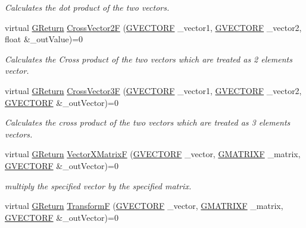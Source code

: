 \begin{DoxyCompactItemize}
\begin{DoxyCompactList}\small\item\em Calculates the dot product of the two vectors. \end{DoxyCompactList}\item 
virtual \mbox{\hyperlink{namespace_g_w_a67a839e3df7ea8a5c5686613a7a3de21}{G\+Return}} \mbox{\hyperlink{class_g_w_1_1_m_a_t_h_1_1_g_vector_a9c8df3e031a91b77a1ea180a8145b9f0}{Cross\+Vector2F}} (\mbox{\hyperlink{struct_g_w_1_1_m_a_t_h_1_1_g_v_e_c_t_o_r_f}{G\+V\+E\+C\+T\+O\+RF}} \+\_\+vector1, \mbox{\hyperlink{struct_g_w_1_1_m_a_t_h_1_1_g_v_e_c_t_o_r_f}{G\+V\+E\+C\+T\+O\+RF}} \+\_\+vector2, float \&\+\_\+out\+Value)=0
\begin{DoxyCompactList}\small\item\em Calculates the Cross product of the two vectors which are treated as 2 elements vector. \end{DoxyCompactList}\item 
virtual \mbox{\hyperlink{namespace_g_w_a67a839e3df7ea8a5c5686613a7a3de21}{G\+Return}} \mbox{\hyperlink{class_g_w_1_1_m_a_t_h_1_1_g_vector_a9da6a4d16d2417c6d6f9dee240cad853}{Cross\+Vector3F}} (\mbox{\hyperlink{struct_g_w_1_1_m_a_t_h_1_1_g_v_e_c_t_o_r_f}{G\+V\+E\+C\+T\+O\+RF}} \+\_\+vector1, \mbox{\hyperlink{struct_g_w_1_1_m_a_t_h_1_1_g_v_e_c_t_o_r_f}{G\+V\+E\+C\+T\+O\+RF}} \+\_\+vector2, \mbox{\hyperlink{struct_g_w_1_1_m_a_t_h_1_1_g_v_e_c_t_o_r_f}{G\+V\+E\+C\+T\+O\+RF}} \&\+\_\+out\+Vector)=0
\begin{DoxyCompactList}\small\item\em Calculates the cross product of the two vectors which are treated as 3 elements vectors. \end{DoxyCompactList}\item 
virtual \mbox{\hyperlink{namespace_g_w_a67a839e3df7ea8a5c5686613a7a3de21}{G\+Return}} \mbox{\hyperlink{class_g_w_1_1_m_a_t_h_1_1_g_vector_a215565b6f224c48bd00d8625e64a703d}{Vector\+X\+MatrixF}} (\mbox{\hyperlink{struct_g_w_1_1_m_a_t_h_1_1_g_v_e_c_t_o_r_f}{G\+V\+E\+C\+T\+O\+RF}} \+\_\+vector, \mbox{\hyperlink{struct_g_w_1_1_m_a_t_h_1_1_g_m_a_t_r_i_x_f}{G\+M\+A\+T\+R\+I\+XF}} \+\_\+matrix, \mbox{\hyperlink{struct_g_w_1_1_m_a_t_h_1_1_g_v_e_c_t_o_r_f}{G\+V\+E\+C\+T\+O\+RF}} \&\+\_\+out\+Vector)=0
\begin{DoxyCompactList}\small\item\em multiply the specified vector by the specified matrix. \end{DoxyCompactList}\item 
virtual \mbox{\hyperlink{namespace_g_w_a67a839e3df7ea8a5c5686613a7a3de21}{G\+Return}} \mbox{\hyperlink{class_g_w_1_1_m_a_t_h_1_1_g_vector_ad57877d55d7a322db99770af27797957}{TransformF}} (\mbox{\hyperlink{struct_g_w_1_1_m_a_t_h_1_1_g_v_e_c_t_o_r_f}{G\+V\+E\+C\+T\+O\+RF}} \+\_\+vector, \mbox{\hyperlink{struct_g_w_1_1_m_a_t_h_1_1_g_m_a_t_r_i_x_f}{G\+M\+A\+T\+R\+I\+XF}} \+\_\+matrix, \mbox{\hyperlink{struct_g_w_1_1_m_a_t_h_1_1_g_v_e_c_t_o_r_f}{G\+V\+E\+C\+T\+O\+RF}} \&\+\_\+out\+Vector)=0

\end{DoxyCompactItemize}
